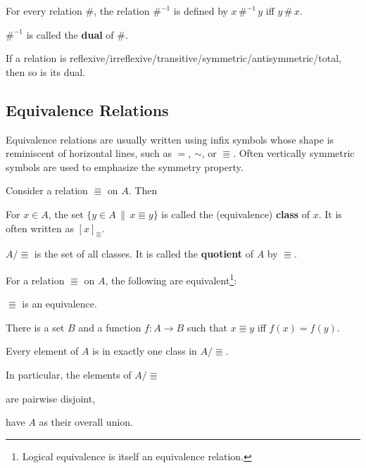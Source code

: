 \begin{definition}
For every relation $\#$, the relation $\#^{-1}$ is defined by $x\,\#^{-1}\, y$ iff $y\,\#\,x$.

$\#^{-1}$ is called the \textbf{dual} of $\#$.
\end{definition}

\begin{theorem}
If a relation is reflexive/irreflexive/transitive/symmetric/antisymmetric/total, then so is its dual.
\end{theorem}

\subsection{Equivalence Relations}

Equivalence relations are usually written using infix symbols whose shape is reminiscent of horizontal lines, such as $=$, $\sim$, or $\Equiv$.
Often vertically symmetric symbols are used to emphasize the symmetry property.

\begin{definition}[Quotient]
Consider a relation $\Equiv$ on $A$.
Then
\begin{compactitem}
 \item For $x\in A$, the set $\{y\in A\,\|\,x\Equiv y\}$ is called the (equivalence) \textbf{class} of $x$.
  It is often written as $[x]_\Equiv$.
 \item $A/\Equiv$ is the set of all classes.
  It is called the \textbf{quotient} of $A$ by $\Equiv$.
\end{compactitem}
\end{definition}

\begin{theorem}
For a relation $\Equiv$ on $A$, the following are equivalent\footnote{Logical equivalence is itself an equivalence relation.}:
\begin{compactitem}
 \item $\Equiv$ is an equivalence.
 \item There is a set $B$ and a function $f:A\to B$ such that $x\Equiv y$ iff $f(x)=f(y)$.
 \item Every element of $A$ is in exactly one class in $A/\Equiv$.
\end{compactitem}

In particular, the elements of $A/\Equiv$ 
\begin{compactitem}
 \item are pairwise disjoint,
 \item have $A$ as their overall union.
\end{compactitem}
\end{theorem}

